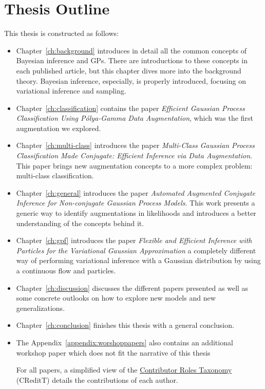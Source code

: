 \section{Thesis Outline}

This thesis is constructed as follows:
\begin{itemize}
    \item Chapter~\ref{ch:background} introduces in detail all the common concepts of Bayesian inference and \ac{GPs}.
    There are introductions to these concepts in each published article, but this chapter dives more into the background theory.
    Bayesian inference, especially, is properly introduced, focusing on variational inference and sampling.
    \item Chapter~\ref{ch:classification} contains the paper \textit{Efficient Gaussian Process Classification Using P\'olya-Gamma Data Augmentation}, which was the first augmentation we explored.
    \item Chapter~\ref{ch:multi-class} introduces the paper \textit{Multi-Class Gaussian Process Classification Made Conjugate: Efficient Inference via Data Augmentation}.
    This paper brings new augmentation concepts to a more complex problem: multi-class classification.
    \item Chapter~\ref{ch:general} introduces the paper \textit{Automated Augmented Conjugate Inference for Non-conjugate Gaussian Process Models}.
    This work presents a generic way to identify augmentations in likelihoods and introduces a better understanding of the concepts behind it.
    \item Chapter~\ref{ch:gpf} introduces the paper \textit{Flexible and Efficient Inference with Particles for the Variational Gaussian Approximation } a completely different way of performing variational inference with a Gaussian distribution by using a continuous flow and particles.
    \item Chapter~\ref{ch:discussion} discusses the different papers presented as well as some concrete outlooks on how to explore new models and new generalizations.
    \item Chapter~\ref{ch:conclusion} finishes this thesis with a general conclusion.
    \item The Appendix~\ref{appendix:worshoppapers} also contains an additional workshop paper which does not fit the narrative of this thesis 

    For all papers, a simplified view of the \href{https://mdpi-res.com/data/contributor-role-instruction.pdf}{Contributor Roles Taxonomy} (CReditT) details the contributions of each author.

\end{itemize}

